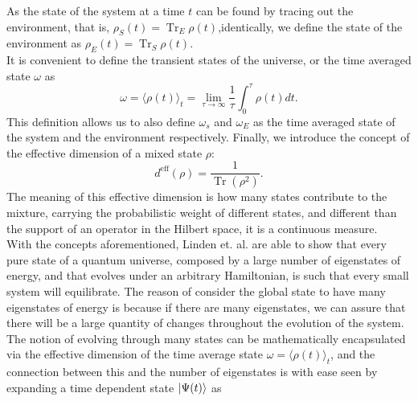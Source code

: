 As the state of the system at a time $t$ can be found by tracing out the environment, that is, $\rho_S(t)=\operatorname{Tr}_E \rho(t)$,identically, we define the state of the environment as $\rho_E(t)=\operatorname{Tr}_S \rho(t)$.\\
\indent It is convenient to define the transient states of the universe, or the time averaged state $\omega$ as
\begin{equation}
\omega=\langle\rho(t)\rangle_{t}=\lim _{\tau \rightarrow \infty} \frac{1}{\tau} \int_{0}^{\tau} \rho(t) d t.
\label{CH1:average_time_state}
\end{equation}
This definition allows us to also define $\omega_s$ and $\omega_E$ as the time averaged state of the system and the environment respectively. Finally, we introduce the concept of the effective dimension of a mixed state $\rho$:
\begin{equation}
d^{\mathrm{eff}}(\rho)=\frac{1}{\operatorname{Tr}\left(\rho^{2}\right)}.
\label{CH1:Effective_dimension}
\end{equation}
The meaning of this effective dimension is how many states contribute to the mixture, carrying the probabilistic weight of different states, and different than the support of an operator in the Hilbert space, it is a continuous measure.\\
\indent With the concepts aforementioned, Linden et. al.  \cite{linden_quantum_2009} are able to show that every pure state of a quantum universe, composed by a large number of eigenstates of energy, and that evolves under an arbitrary Hamiltonian, is such that every small system will equilibrate. The reason of consider the global state to have many eigenstates of energy is because if there are many eigenstates, we can assure that there will be a large quantity of changes throughout the evolution of the system. The notion of evolving through many states can be mathematically encapsulated via the effective dimension of the time average state $\omega=\langle\rho(t)\rangle_{t}$, and the connection between this and the number of eigenstates is with ease seen by expanding a time dependent state $\mathinner{|{\Psi(t)}\rangle}$ as

